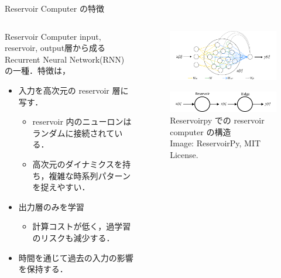 \begin{frame}{Reservoir Computer の特徴}
    \begin{columns}[T] %
  
      \begin{column}{.5\textwidth}
        \begin{block}{Reservoir Computer}
          input, reservoir, output層から成るRecurrent Neural Network(RNN) の一種．特徴は，
          \begin{itemize}
            \item 入力を高次元の reservoir 層に写す．\begin{itemize}
              \item reservoir 内のニューロンはランダムに接続されている．
              \item 高次元のダイナミクスを持ち，複雑な時系列パターンを捉えやすい．
            \end{itemize}
            \item 出力層のみを学習\begin{itemize}
              \item 計算コストが低く，過学習のリスクも減少する．
            \end{itemize}
            \item 時間を通じて過去の入力の影響を保持する．
          \end{itemize}
        \end{block}
      \end{column}

      \begin{column}{.5\textwidth}
        \begin{figure}
            \includegraphics[width=\textwidth]{Fig/esn.svg.png}
        \end{figure}  
        \begin{figure}
            \includegraphics[width=\textwidth]{Fig/esn_nodes.svg.png}
            \caption{\scriptsize{Reservoirpy での reservoir computer の構造}\\ \tiny{Image: ReservoirPy, MIT License.}}
        \end{figure}  
      \end{column}
    \end{columns}
  \end{frame}


